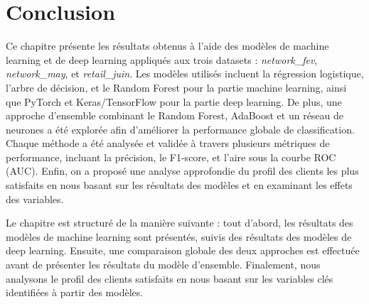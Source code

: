 \section{Conclusion}

Ce chapitre présente les résultats obtenus à l'aide des modèles de machine learning et de deep learning appliqués aux trois datasets : \textit{network\_fev}, \textit{network\_may}, et \textit{retail\_juin}. Les modèles utilisés incluent la régression logistique, l'arbre de décision, et le Random Forest pour la partie machine learning, ainsi que PyTorch et Keras/TensorFlow pour la partie deep learning. De plus, une approche d'ensemble combinant le Random Forest, AdaBoost et un réseau de neurones a été explorée afin d'améliorer la performance globale de classification. Chaque méthode a été analysée et validée à travers plusieurs métriques de performance, incluant la précision, le F1-score, et l'aire sous la courbe ROC (AUC). Enfin, on a proposé une analyse approfondie du profil des clients les plus satisfaits en nous basant sur les résultats des modèles et en examinant les effets des variables.

Le chapitre est structuré de la manière suivante : tout d'abord, les résultats des modèles de machine learning sont présentés, suivis des résultats des modèles de deep learning. Ensuite, une comparaison globale des deux approches est effectuée avant de présenter les résultats du modèle d'ensemble. Finalement, nous analysons le profil des clients satisfaits en nous basant sur les variables clés identifiées à partir des modèles.
